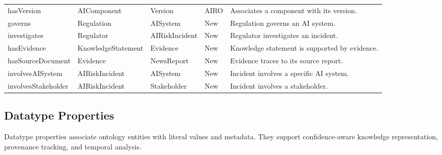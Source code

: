 \documentclass[a4paper,fleqn]{cas-dc}
\begin{document}
\begin{longtable}{>{\raggedright\arraybackslash}p{2.9cm}p{2.2cm}p{2.2cm}p{1.1cm}p{5.0cm}}
hasVersion & AIComponent & Version & AIRO & Associates a component with its version. \\
governs & Regulation & AISystem & New & Regulation governs an AI system. \\
investigates & Regulator & AIRiskIncident & New & Regulator investigates an incident. \\
hasEvidence & KnowledgeStatement & Evidence & New & Knowledge statement is supported by evidence. \\
hasSourceDocument & Evidence & NewsReport & New & Evidence traces to its source report. \\
involvesAISystem & AIRiskIncident & AISystem & New & Incident involves a specific AI system. \\
involves\allowbreak Stakeholder & AIRiskIncident & Stakeholder & New & Incident involves a stakeholder. \\

\end{longtable}

\subsection{Datatype Properties}

Datatype properties associate ontology entities with literal values and metadata.
They support confidence-aware knowledge representation, provenance tracking, and temporal analysis.
\end{document}
